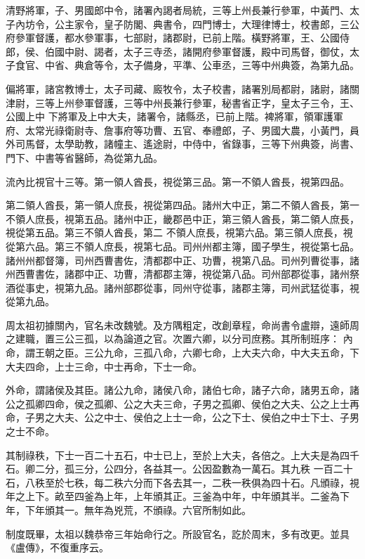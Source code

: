 \begin{pinyinscope}
 清野將軍，子、男國郎中令，諸署內謁者局統，三等上州長兼行參軍，中黃門、太子內坊令，公主家令，皇子防閣、典書令，四門博士，大理律博士，校書郎，三公府參軍督護，都水參軍事，七部尉，諸郡尉，已前上階。橫野將軍，王、公國侍郎，侯、伯國中尉、謁者，太子三寺丞，諸開府參軍督護，殿中司馬督，御仗，太子食官、中省、典倉等令，太子備身，平準、公車丞，三等中州典簽，為第九品。



 偏將軍，諸宮教博士，太子司藏、廄牧令，太子校書，諸署別局都尉，諸尉，諸關津尉，三等上州參軍督護，三等中州長兼行參軍，秘書省正字，皇太子三令，王、公國上中
 下將軍及上中大夫，諸署令，諸縣丞，已前上階。裨將軍，領軍護軍府、太常光祿衛尉寺、詹事府等功曹、五官、奉禮郎，子、男國大農，小黃門，員外司馬督，太學助教，諸幢主、遙途尉，中侍中，省錄事，三等下州典簽，尚書、門下、中書等省醫師，為從第九品。



 流內比視官十三等。第一領人酋長，視從第三品。第一不領人酋長，視第四品。



 第二領人酋長，第一領人庶長，視從第四品。諸州大中正，第二不領人酋長，第一不領人庶長，視第五品。諸州中正，畿郡邑中正，第三領人酋長，第二領人庶長，視從第五品。第三不領人酋長，第二
 不領人庶長，視第六品。第三領人庶長，視從第六品。第三不領人庶長，視第七品。司州州都主簿，國子學生，視從第七品。諸州州都督簿，司州西曹書佐，清都郡中正、功曹，視第八品。司州列曹從事，諸州西曹書佐，諸郡中正、功曹，清都郡主簿，視從第八品。司州部郡從事，諸州祭酒從事史，視第九品。諸州部郡從事，同州守從事，諸郡主簿，司州武猛從事，視從第九品。



 周太祖初據關內，官名未改魏號。及方隅粗定，改創章程，命尚書令盧辯，遠師周之建職，置三公三孤，以為論道之官。次置六卿，以分司庶務。其所制班序：
 內命，謂王朝之臣。三公九命，三孤八命，六卿七命，上大夫六命，中大夫五命，下大夫四命，上士三命，中士再命，下士一命。



 外命，謂諸侯及其臣。諸公九命，諸侯八命，諸伯七命，諸子六命，諸男五命，諸公之孤卿四命，侯之孤卿、公之大夫三命，子男之孤卿、侯伯之大夫、公之上士再命，子男之大夫、公之中士、侯伯之上士一命，公之下士、侯伯之中士下士、子男之士不命。



 其制祿秩，下士一百二十五石，中士已上，至於上大夫，各倍之。上大夫是為四千石。卿二分，孤三分，公四分，各益其一。公因盈數為一萬石。其九秩
 一百二十石，八秩至於七秩，每二秩六分而下各去其一，二秩一秩俱為四十石。凡頒祿，視年之上下。畝至四釜為上年，上年頒其正。三釜為中年，中年頒其半。二釜為下年，下年頒其一。無年為兇荒，不頒祿。六官所制如此。



 制度既畢，太祖以魏恭帝三年始命行之。所設官名，訖於周末，多有改更。並具《盧傳》，不復重序云。



\end{pinyinscope}